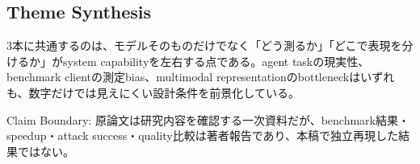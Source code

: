 \subsection{Theme Synthesis}

3本に共通するのは、モデルそのものだけでなく「どう測るか」「どこで表現を分けるか」がsystem capabilityを左右する点である。agent taskの現実性、benchmark clientの測定bias、multimodal representationのbottleneckはいずれも、数字だけでは見えにくい設計条件を前景化している。\autocite{src-24add4f36a45,src-99d7ea892e92,src-ea2dcbeedd27}


\begin{claimboundary}
Claim Boundary: 原論文は研究内容を確認する一次資料だが、benchmark結果・speedup・attack success・quality比較は著者報告であり、本稿で独立再現した結果ではない。\autocite{src-24add4f36a45,src-99d7ea892e92,src-ea2dcbeedd27}
\end{claimboundary}

